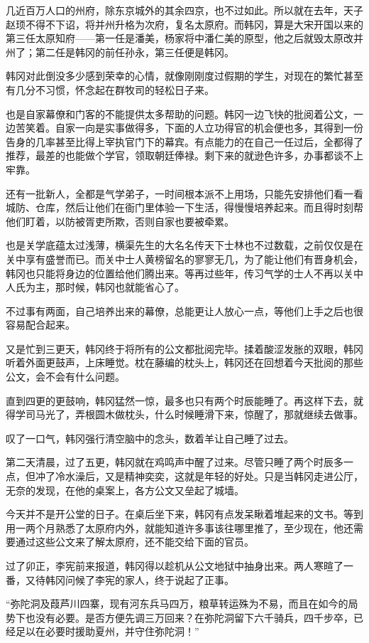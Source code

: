 几近百万人口的州府，除东京城外的其余四京，也不过如此。所以就在去年，天子赵顼不得不下诏，将并州升格为次府，复名太原府。而韩冈，算是大宋开国以来的第三任太原知府——第一任是潘美，杨家将中潘仁美的原型，他之后就毁太原改并州了；第二任是韩冈的前任孙永，第三任便是韩冈。

韩冈对此倒没多少感到荣幸的心情，就像刚刚度过假期的学生，对现在的繁忙甚至有几分不习惯，怀念起在群牧司的轻松日子来。

也是自家幕僚和门客的不能提供太多帮助的问题。韩冈一边飞快的批阅着公文，一边苦笑着。自家一向是实事做得多，下面的人立功得官的机会便也多，其得到一份告身的几率甚至比得上宰执官门下的幕宾。有点能力的在自己一任过后，全都得了推荐，最差的也能做个学官，领取朝廷俸禄。剩下来的就逊色许多，办事都谈不上牢靠。

还有一批新人，全都是气学弟子，一时间根本派不上用场，只能先安排他们看一看城防、仓库，然后让他们在衙门里体验一下生活，得慢慢培养起来。而且得时刻帮他们盯着，以防被胥吏所欺，否则自家也要被牵累。

也是关学底蕴太过浅薄，横渠先生的大名名传天下士林也不过数载，之前仅仅是在关中享有盛誉而已。而关中士人黄榜留名的寥寥无几，为了能让他们有晋身机会，韩冈也只能将身边的位置给他们腾出来。等再过些年，传习气学的士人不再以关中人氏为主，那时候，韩冈也就能省心了。

不过事有两面，自己培养出来的幕僚，总能更让人放心一点，等他们上手之后也很容易配合起来。

又是忙到三更天，韩冈终于将所有的公文都批阅完毕。揉着酸涩发胀的双眼，韩冈听着外面更鼓声，上床睡觉。枕在藤编的枕头上，韩冈还在回想着今天批阅的那些公文，会不会有什么问题。

直到四更的更鼓响，韩冈猛然一惊，最多也只有两个时辰能睡了。再这样下去，就得学司马光了，弄根圆木做枕头，什么时候睡滑下来，惊醒了，那就继续去做事。

叹了一口气，韩冈强行清空脑中的念头，数着羊让自己睡了过去。

第二天清晨，过了五更，韩冈就在鸡鸣声中醒了过来。尽管只睡了两个时辰多一点，但冲了冷水澡后，又是精神奕奕，这就是年轻的好处。只是当韩冈走进公厅，无奈的发现，在他的桌案上，各方公文又垒起了城墙。

今天并不是开公堂的日子。在桌后坐下来，韩冈有点发呆瞅着堆起来的文书。等到用一两个月熟悉了太原府内外，就能知道许多事该往哪里推了，至少现在，他还需要通过这些公文来了解太原府，还不能交给下面的官员。

过了卯正，李宪前来报道，韩冈得以趁机从公文地狱中抽身出来。两人寒暄了一番，又待韩冈问候了李宪的家人，终于说起了正事。

“弥陀洞及葭芦川四寨，现有河东兵马四万，粮草转运殊为不易，而且在如今的局势下也没有必要。是否方便先调三万回来？在弥陀洞留下六千骑兵，四千步卒，已经足以在必要时援助夏州，并守住弥陀洞！”

